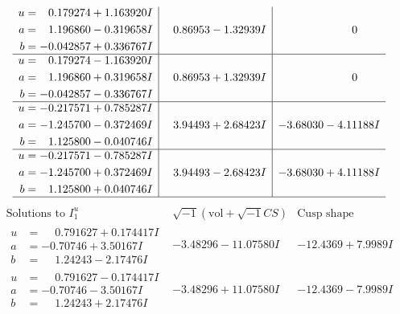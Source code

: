 \documentclass[1p]{elsarticle_modified}
\theoremstyle{definition}
\newcommand{\I}{\sqrt{-1}}
\begin{document}
$$\begin{array}{c|c|c}
\begin{aligned}
u &= \phantom{-}0.179274 + 1.163920 I \\
a &= \phantom{-}1.196860 - 0.319658 I \\
b &= -0.042857 + 0.336767 I\end{aligned}
 & \phantom{-}0.86953 - 1.32939 I & \phantom{-0.000000 } 0 \\ \hline\begin{aligned}
u &= \phantom{-}0.179274 - 1.163920 I \\
a &= \phantom{-}1.196860 + 0.319658 I \\
b &= -0.042857 - 0.336767 I\end{aligned}
 & \phantom{-}0.86953 + 1.32939 I & \phantom{-0.000000 } 0 \\ \hline\begin{aligned}
u &= -0.217571 + 0.785287 I \\
a &= -1.245700 - 0.372469 I \\
b &= \phantom{-}1.125800 - 0.040746 I\end{aligned}
 & \phantom{-}3.94493 + 2.68423 I & -3.68030 - 4.11188 I \\ \hline\begin{aligned}
u &= -0.217571 - 0.785287 I \\
a &= -1.245700 + 0.372469 I \\
b &= \phantom{-}1.125800 + 0.040746 I\end{aligned}
 & \phantom{-}3.94493 - 2.68423 I & -3.68030 + 4.11188 I\\
 \hline 
 \end{array}$$\newpage$$\begin{array}{c|c|c}  
\text{Solutions to }I^u_{1}& \I (\text{vol} + \sqrt{-1}CS) & \text{Cusp shape}\\
 \hline 
\begin{aligned}
u &= \phantom{-}0.791627 + 0.174417 I \\
a &= -0.70746 + 3.50167 I \\
b &= \phantom{-}1.24243 - 2.17476 I\end{aligned}
 & -3.48296 - 11.07580 I & -12.4369 + 7.9989 I \\ \hline\begin{aligned}
u &= \phantom{-}0.791627 - 0.174417 I \\
a &= -0.70746 - 3.50167 I \\
b &= \phantom{-}1.24243 + 2.17476 I\end{aligned}
 & -3.48296 + 11.07580 I & -12.4369 - 7.9989 I \\ \hline\begin{aligned}

\end{aligned}
\end{array}$$
\end{document}
